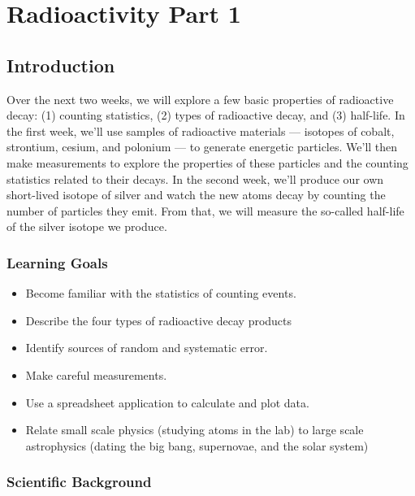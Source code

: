 \chapter{Radioactivity Part 1}


\section{Introduction}

Over the next two weeks, we will explore a few basic properties of radioactive decay: (1) counting statistics, (2) types of radioactive decay, and (3) half-life. In the first week, we'll use samples of radioactive materials --- isotopes of cobalt, strontium, cesium, and polonium --- to generate energetic particles. We'll then make measurements to explore the properties of these particles and the counting statistics related to their decays. In the second week, we’ll produce our own short-lived isotope of silver and watch the new atoms decay by counting the number of particles they emit. From that, we will measure the so-called half-life of the silver isotope we produce.

\subsection{Learning Goals}

\begin{itemize}
	\item Become familiar with the statistics of counting events.
	
	\item Describe the four types of radioactive decay products
	
	\item Identify sources of random and systematic error.
	
	\item Make careful measurements.
	
	\item Use a spreadsheet application to calculate and plot data.
	
	\item Relate small scale physics (studying atoms in the lab) to large scale astrophysics (dating the big bang, supernovae, and the solar system)
\end{itemize}

\subsection{Scientific Background}

